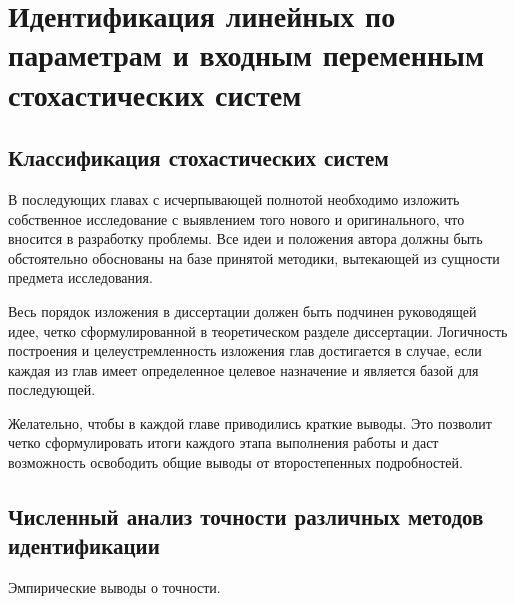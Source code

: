 \chapter[Идентификация линейных по параметрам и входным переменным \\ стохастических систем]{%
  Идентификация линейных по параметрам и
  входным переменным стохастических систем
}

\section{Классификация стохастических систем}


В последующих главах с исчерпывающей полнотой  необходимо изложить собственное исследование с выявлением того нового и оригинального, что вносится в разработку проблемы. Все идеи и положения автора должны быть обстоятельно обоснованы на базе принятой методики, вытекающей из сущности предмета исследования.

Весь порядок изложения в диссертации должен быть подчинен  руководящей идее, четко сформулированной в теоретическом разделе диссертации. Логичность построения и целеустремленность изложения  глав достигается в случае, если каждая из глав имеет определенное целевое назначение и является базой для последующей.

Желательно, чтобы в каждой главе приводились краткие выводы. Это позволит четко сформулировать итоги каждого этапа выполнения работы и даст возможность освободить общие выводы от второстепенных подробностей.

\section{Численный анализ точности различных методов идентификации}

Эмпирические выводы о точности.